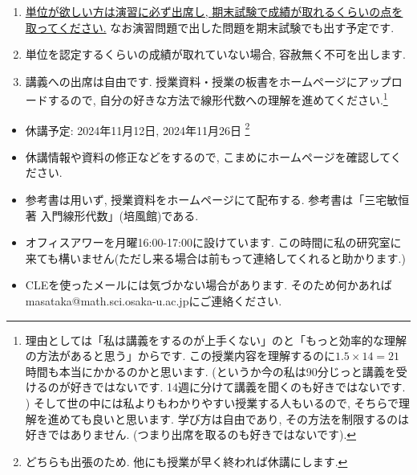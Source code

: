 \documentclass[dvipdfmx,a4paper,11pt]{article}
\theoremstyle{definition}
\begin{document}
\medskip
{}
\begin{enumerate}
  \setlength{\parskip}{0cm} 
  \setlength{\itemsep}{0cm} 
\item \underline{単位が欲しい方は演習に必ず出席し, 期末試験で成績が取れるくらいの点を取ってください.} なお演習問題で出した問題を期末試験でも出す予定です. 
\item 単位を認定するくらいの成績が取れていない場合, 容赦無く不可を出します. 
\item 講義への出席は自由です. 授業資料・授業の板書をホームページにアップロードするので, 自分の好きな方法で線形代数への理解を進めてください.\footnote{理由としては「私は講義をするのが上手くない」のと「もっと効率的な理解の方法があると思う」からです. この授業内容を理解するのに$1.5 \times 14 = 21$時間も本当にかかるのかと思います. (というか今の私は90分じっと講義を受けるのが好きではないです.  14週に分けて講義を聞くのも好きではないです. ) そして世の中には私よりもわかりやすい授業する人もいるので, そちらで理解を進めても良いと思います. 学び方は自由であり, その方法を制限するのは好きではありません. (つまり出席を取るのも好きではないです).}
\end{enumerate}


\vspace{11pt}
\begin{itemize}
  \setlength{\parskip}{0cm} %
  \setlength{\itemsep}{0cm} %
  \item 休講予定: 2024年11月12日,  2024年11月26日  
  \footnote{どちらも出張のため. 他にも授業が早く終われば休講にします.} 
  \item 休講情報や資料の修正などをするので, こまめにホームページを確認してください.
  \item 参考書は用いず, 授業資料をホームページにて配布する. 参考書は「三宅敏恒著 入門線形代数」(培風館)である.
   \item オフィスアワーを月曜16:00-17:00に設けています. この時間に私の研究室に来ても構いません(ただし来る場合は前もって連絡してくれると助かります.)
   \item CLEを使ったメールには気づかない場合があります. そのため何かあればmasataka@math.sci.osaka-u.ac.jpにご連絡ください. 
 \end{itemize}
\end{document}
